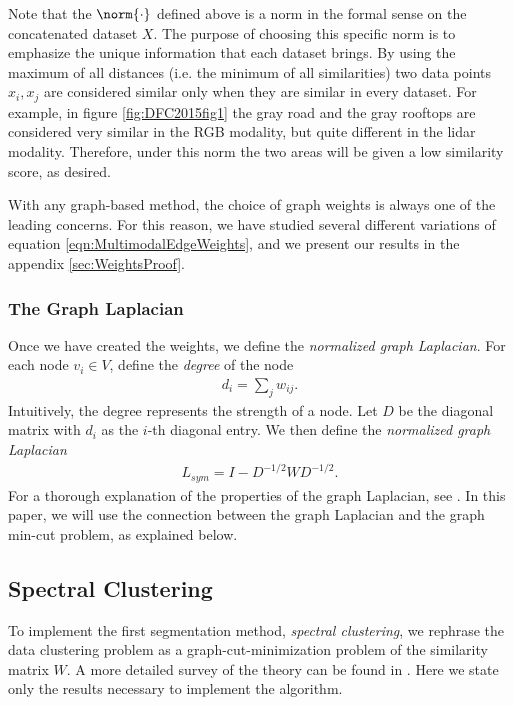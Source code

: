\documentclass[journal]{IEEEtran}
\begin{document}
Note that the $\norm{\cdot}$ defined above is a norm in the formal sense on the
concatenated dataset $X$. The purpose of choosing this specific norm is to
emphasize the unique information that each dataset brings. By using the maximum
of all distances (i.e. the minimum of all similarities) two data points
$x_i,x_j$ are considered similar only when they are similar in every
dataset. For example, in figure \ref{fig:DFC2015fig1} the gray road and the gray
rooftops are considered very similar in the RGB modality, but quite different in
the lidar modality. Therefore, under this norm the two areas will be given a low
similarity score, as desired.

With any graph-based method, the choice of graph weights is always one of the leading concerns. For this reason, we have studied several different variations of equation \ref{eqn:MultimodalEdgeWeights}, and we present our results in the appendix \ref{sec:WeightsProof}.

\subsubsection{The Graph Laplacian}\label{sec:GraphLaplacian}

Once we have created the weights, we define the \emph{normalized graph
  Laplacian}.  For each node $v_i\in V$, define the \emph{degree} of the node
\begin{align}
  d_i = \sum_j w_{ij}.
\end{align}
Intuitively, the degree represents the strength of a node. Let $D$ be the
diagonal matrix with $d_i$ as the $i$-th diagonal entry. We then define the
\emph{normalized graph Laplacian}
\begin{align}
  L_{sym} = I - D^{-1/2}WD^{-1/2}.
\end{align}
For a thorough explanation of the properties of the graph Laplacian, see
\cite{Mohar91}. In this paper, we will use the connection between the graph
Laplacian and the graph min-cut problem, as explained below.

\subsection{Spectral Clustering}\label{sec:SpecClust}

To implement the first segmentation method, \emph{spectral clustering}, we
rephrase the data clustering problem as a graph-cut-minimization problem of the
similarity matrix $W$. A more detailed survey of the theory can be found in
\cite{vonLuxburg07}. Here we state only the results necessary to implement the
algorithm.
\end{document}
